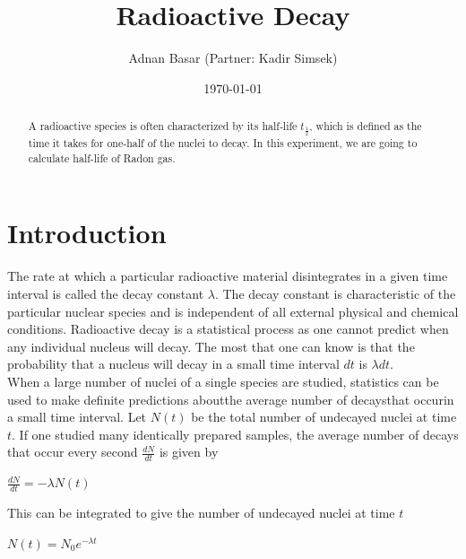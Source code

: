 \documentclass[aps,twocolumn,secnumarabic,nobalancelastpage,amsmath,amssymb,
nofootinbib]{revtex4}
\begin{document}
\title{Radioactive Decay}
\author         {Adnan Basar (Partner: Kadir Simsek)}
\date{\today}





\begin{abstract}
A radioactive species is often characterized by its half‐life ${t}_{\frac{1}{2}}$, which is defined as the time it takes for one‐half of the nuclei to decay. In this experiment, we are going to calculate half-life of Radon gas.
\end{abstract}

\maketitle

\section{Introduction}
The rate at which a particular radioactive material disintegrates in a given time interval is called the
decay constant $\lambda$. The decay constant is characteristic of the particular nuclear species and is
independent of all external physical and chemical conditions. Radioactive decay is a statistical process as
one cannot predict when any individual nucleus will decay. The most that one can know is that the
probability that a nucleus will decay in a small time interval $dt$ is $\lambda{dt}$.\\

When a large number of nuclei of a single species are studied, statistics can be used to make definite
predictions aboutthe average number of decaysthat occurin a small time interval. Let $N(t)$ be the total
number of undecayed nuclei at time $t$. If one studied many identically prepared samples, the average
number of decays that occur every second $\frac{dN}{dt}$ is given by

\begin{center}

$\frac{dN}{dt}=-\lambda{N(t)}$

\end{center}

This can be integrated to give the number of undecayed nuclei at time $t$

\begin{center}

$N(t)={N}_{0}{e}^{-\lambda{t}}$


\end{center}
\end{document}
